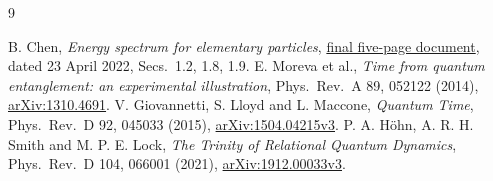\documentclass[11pt,a4paper]{article}
\begin{document}
\begin{thebibliography}{9}\small\raggedright
{} B. Chen, \emph{Energy spectrum for elementary particles},
\href{https://indico.cern.ch/event/1109513/contributions/4969967/attachments/2480973/4410560/Energy\%20spectrum\%20for\%20elementary\%20particles_final.pdf}
{final five-page document}, dated 23 April 2022, Secs.\ 1.2, 1.8, 1.9.
 E. Moreva et al., \emph{Time from quantum entanglement:
an experimental illustration}, Phys.\ Rev.\ A 89, 052122 (2014),
\href{https://arxiv.org/abs/1310.4691}{arXiv:1310.4691}.
 V. Giovannetti, S. Lloyd and L. Maccone,
\emph{Quantum Time}, Phys.\ Rev.\ D 92, 045033 (2015),
\href{https://arxiv.org/abs/1504.04215v3}{arXiv:1504.04215v3}.
 P. A. H\"ohn, A. R. H. Smith and M. P. E. Lock,
\emph{The Trinity of Relational Quantum Dynamics},
Phys.\ Rev.\ D 104, 066001 (2021),
\href{https://arxiv.org/abs/1912.00033v3}{arXiv:1912.00033v3}.
\end{thebibliography}
\end{document}

